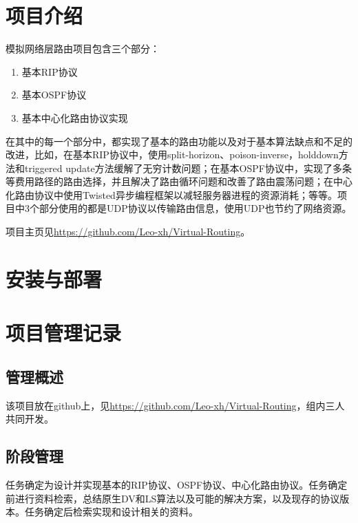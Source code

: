 \documentclass[15pt]{ctexart}
\begin{document}

\tableofcontents
\newpage
\section{项目介绍} %
\label{sec:项目介绍}
	模拟网络层路由项目包含三个部分：
	\begin{enumerate}
		\item 基本RIP协议
		\item 基本OSPF协议
		\item 基本中心化路由协议实现
	\end{enumerate}
	\par 在其中的每一个部分中，都实现了基本的路由功能以及对于基本算法缺点和不足的改进，比如，在基本RIP协议中，使用split-horizon、poison-inverse，holddown方法和triggered update方法缓解了无穷计数问题；在基本OSPF协议中，实现了多条等费用路径的路由选择，并且解决了路由循环问题和改善了路由震荡问题；在中心化路由协议中使用Twisted异步编程框架以减轻服务器进程的资源消耗；等等。项目中3个部分使用的都是UDP协议以传输路由信息，使用UDP也节约了网络资源。
	\par 项目主页见\url{https://github.com/Leo-xh/Virtual-Routing}。




\section{安装与部署} %
\label{sec:安装与部署}


\section{项目管理记录} %
\label{sec:项目管理记录}
	\subsection{管理概述} %
	\label{sub:管理概述}
		该项目放在github上，见\url{https://github.com/Leo-xh/Virtual-Routing}，组内三人共同开发。
	\subsection{阶段管理} %
	\label{sub:阶段管理}
		任务确定为设计并实现基本的RIP协议、OSPF协议、中心化路由协议。任务确定前进行资料检索，总结原生DV和LS算法以及可能的解决方案，以及现存的协议版本。任务确定后检索实现和设计相关的资料。
\end{document}
